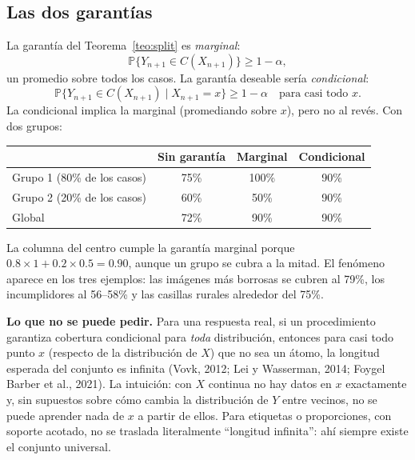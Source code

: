 \documentclass[11pt]{article}
\theoremstyle{plain}
\theoremstyle{definition}
\theoremstyle{remark}
\newcommand{\Prob}{\mathbb P}
\newcommand{\dest}[1]{\par\needspace{4\baselineskip}\textbf{#1}\quad}
\begin{document}
\subsection{Las dos garantías}
La garantía del Teorema~\ref{teo:split} es \emph{marginal}:
\[
 \Prob\{Y_{n+1}\in C(X_{n+1})\}\ge1-\alpha ,
\]
un promedio sobre todos los casos. La garantía deseable sería \emph{condicional}:
\[
 \Prob\{Y_{n+1}\in C(X_{n+1})\mid X_{n+1}=x\}\ge1-\alpha\quad\text{para casi todo }x .
\]
La condicional implica la marginal (promediando sobre $x$), pero no al revés. Con dos grupos:
\begin{center}
\begin{tabular}{lccc}
\toprule
& Sin garantía & Marginal & Condicional\\
\midrule
Grupo 1 (80\% de los casos) & 75\% & 100\% & 90\%\\
Grupo 2 (20\% de los casos) & 60\% & 50\% & 90\%\\
Global & 72\% & 90\% & 90\%\\
\bottomrule
\end{tabular}
\end{center}
La columna del centro cumple la garantía marginal porque $0.8\times1+0.2\times0.5=0.90$, aunque un
grupo se cubra a la mitad. El fenómeno aparece en los tres ejemplos: las imágenes más borrosas se
cubren al 79\%, los incumplidores al 56--58\% y las casillas rurales alrededor del 75\%.

\dest{Lo que no se puede pedir.} Para una respuesta real, si un procedimiento garantiza cobertura
condicional para \emph{toda} distribución, entonces para casi todo punto $x$ (respecto de la
distribución de $X$) que no sea un átomo, la longitud esperada del conjunto es infinita (Vovk, 2012;
Lei y Wasserman, 2014; Foygel Barber et al., 2021). La intuición: con $X$ continua no hay datos en
$x$ exactamente y, sin supuestos sobre cómo cambia la distribución de $Y$ entre vecinos, no se puede
aprender nada de $x$ a partir de ellos. Para etiquetas o proporciones, con soporte acotado, no se
traslada literalmente ``longitud infinita'': ahí siempre existe el conjunto universal.
\end{document}
